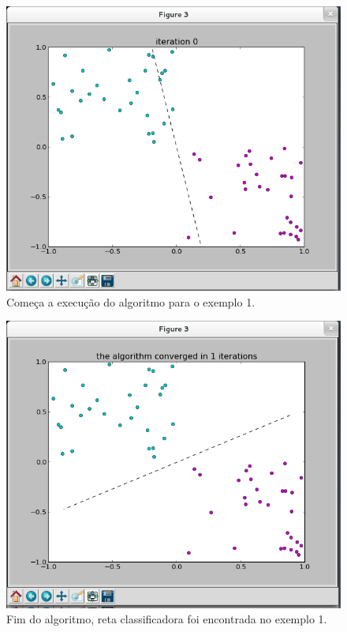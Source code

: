 \documentclass[brazil, a4paper]{article}
\begin{document}
\begin{description}
\newpage

\begin{figure}[!htb]
\centering
\includegraphics[scale=0.42]{ex1-2.png}
\caption{Começa a execução do algoritmo para o exemplo 1.}
\end{figure}

\begin{figure}[!htb]
\centering
\includegraphics[scale=0.42]{ex1-3.png}
\caption{Fim do algoritmo, reta classificadora foi encontrada no exemplo 1.}
\end{figure}


\end{description}
\end{document}
